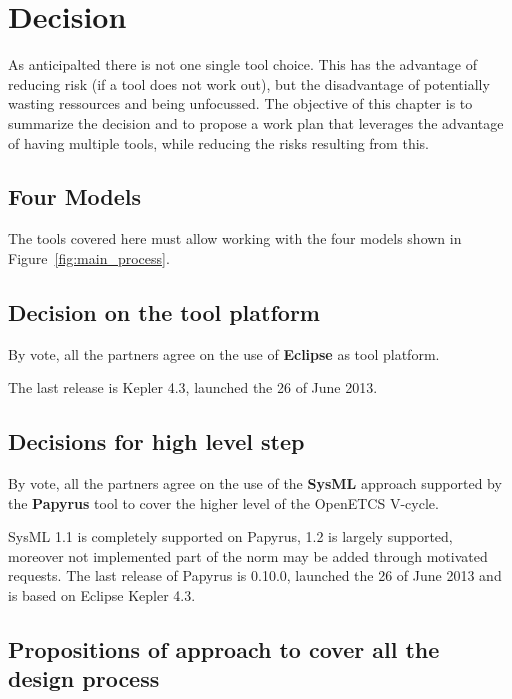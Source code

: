 \chapter{Decision}
\label{sec:decision}

As anticipalted there is not one single tool choice. This has the advantage of reducing risk (if a tool does not work out), but the disadvantage of potentially wasting ressources and being unfocussed.  The objective of this chapter is to summarize the decision and to propose a work plan that leverages the advantage of having multiple tools, while reducing the risks resulting from this.

\section{Four Models}

The tools covered here must allow working with the four models shown in Figure~\ref{fig:main_process}.





\section{Decision on the tool platform}

By vote, all the partners agree on the use of \textbf{Eclipse} as tool platform.

The last release is Kepler 4.3, launched the 26 of June 2013.


\section{Decisions for high level step}

By vote, all the partners agree on the use of the \textbf{SysML} approach supported by the \textbf{Papyrus} tool to cover the higher level of the  OpenETCS V-cycle.

SysML 1.1 is completely supported on Papyrus, 1.2 is largely supported, moreover not implemented part of the norm may be added through motivated requests.
The last release of Papyrus is 0.10.0, launched the 26 of June 2013 and is based on Eclipse Kepler 4.3.

\section{Propositions of approach to cover all the design process}

